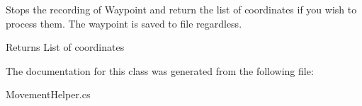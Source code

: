 Stops the recording of Waypoint and return the list of coordinates if you wish to process them. The waypoint is saved to file regardless. 

\begin{DoxyReturn}{Returns}
List of coordinates
\end{DoxyReturn}


The documentation for this class was generated from the following file\-:\begin{DoxyCompactItemize}
\item 
Movement\-Helper.\-cs\end{DoxyCompactItemize}

